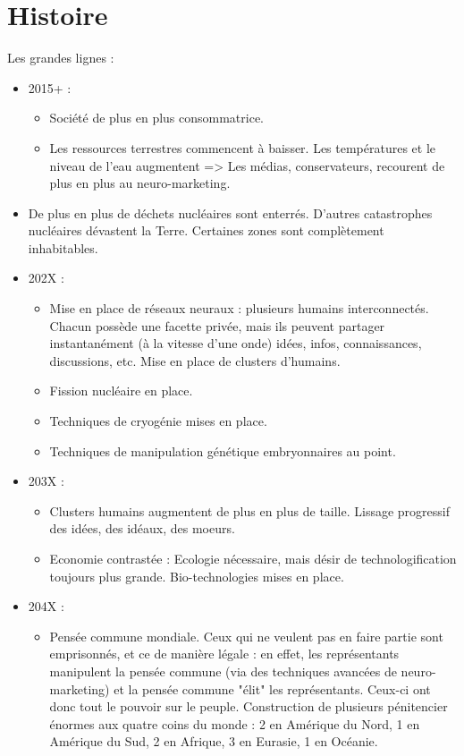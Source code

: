 \section{Histoire}
Les grandes lignes :
\begin{itemize}
	\item 2015+ : \begin{itemize}
		\item Société de plus en plus consommatrice.
		\item Les ressources terrestres commencent à baisser. Les températures et le niveau de l'eau augmentent => Les médias, conservateurs, recourent de plus en plus au neuro-marketing.
	\end{itemize}
		\item De plus en plus de déchets nucléaires sont enterrés. D'autres catastrophes nucléaires dévastent la Terre. Certaines zones sont complètement inhabitables.
	\item 202X : \begin{itemize}
		\item Mise en place de réseaux neuraux : plusieurs humains interconnectés. Chacun possède une facette privée, mais ils peuvent partager instantanément (à la vitesse d'une onde) idées, infos, connaissances, discussions, etc. Mise en place de clusters d'humains.
		\item Fission nucléaire en place.
		\item Techniques de cryogénie mises en place.
		\item Techniques de manipulation génétique embryonnaires au point.
	\end{itemize}
	\item 203X : \begin{itemize}
		\item Clusters humains augmentent de plus en plus de taille. Lissage progressif des idées, des idéaux, des moeurs.
		\item Economie contrastée : Ecologie nécessaire, mais désir de technologification toujours plus grande. Bio-technologies mises en place. 
	\end{itemize}
	\item 204X : \begin{itemize}
		\item Pensée commune mondiale. Ceux qui ne veulent pas en faire partie sont emprisonnés, et ce de manière légale : en effet, les représentants manipulent la pensée commune (via des techniques avancées de neuro-marketing) et la pensée commune "élit" les représentants. Ceux-ci ont donc tout le pouvoir sur le peuple. Construction de plusieurs pénitencier énormes aux quatre coins du monde : 2 en Amérique du Nord, 1 en Amérique du Sud, 2 en Afrique, 3 en Eurasie, 1 en Océanie.

\end{itemize}
\end{itemize}
